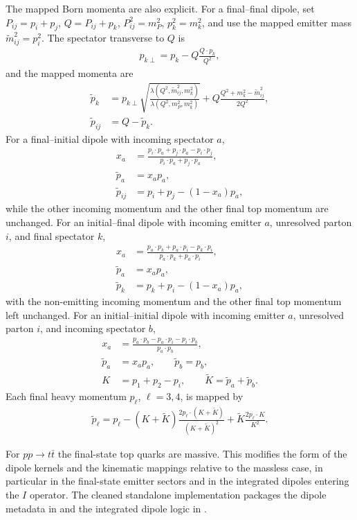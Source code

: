 \documentclass[11pt]{article}
\begin{document}
The mapped Born momenta are also explicit. For a final--final dipole, set $P_{ij}=p_i+p_j$, $Q=P_{ij}+p_k$, $P_{ij}^2=m_{P}^2$, $p_k^2=m_k^2$, and use the mapped emitter mass $\tilde m_{ij}^2=p_i^2$. The spectator transverse to $Q$ is
\begin{align}
p_{k\perp}=p_k-Q\frac{Q\!\cdot p_k}{Q^2},
\end{align}
and the mapped momenta are
\begin{align}
\tilde p_k &=
p_{k\perp}\sqrt{\frac{\lambda(Q^2,\tilde m_{ij}^2,m_k^2)}{\lambda(Q^2,m_P^2,m_k^2)}}
+Q\frac{Q^2+m_k^2-\tilde m_{ij}^2}{2Q^2},\\
\tilde p_{ij} &= Q-\tilde p_k.
\end{align}
For a final--initial dipole with incoming spectator $a$,
\begin{align}
x_a &= \frac{p_i\!\cdot p_a+p_j\!\cdot p_a-p_i\!\cdot p_j}{p_i\!\cdot p_a+p_j\!\cdot p_a},\\
\tilde p_a &= x_a p_a,\\
\tilde p_{ij} &= p_i+p_j-(1-x_a)p_a,
\end{align}
while the other incoming momentum and the other final top momentum are unchanged.
For an initial--final dipole with incoming emitter $a$, unresolved parton $i$, and final spectator $k$,
\begin{align}
x_a &= \frac{p_a\!\cdot p_k+p_a\!\cdot p_i-p_k\!\cdot p_i}{p_a\!\cdot p_k+p_a\!\cdot p_i},\\
\tilde p_a &= x_a p_a,\\
\tilde p_k &= p_k+p_i-(1-x_a)p_a,
\end{align}
with the non-emitting incoming momentum and the other final top momentum left unchanged.
For an initial--initial dipole with incoming emitter $a$, unresolved parton $i$, and incoming spectator $b$,
\begin{align}
x_a &= \frac{p_a\!\cdot p_b-p_a\!\cdot p_i-p_i\!\cdot p_b}{p_a\!\cdot p_b},\\
\tilde p_a &= x_a p_a,
\qquad
\tilde p_b=p_b,\\
K&=p_1+p_2-p_i,
\qquad
\tilde K=\tilde p_a+\tilde p_b.
\end{align}
Each final heavy momentum $p_\ell$, $\ell=3,4$, is mapped by
\begin{align}
\tilde p_\ell = p_\ell
- (K+\tilde K)\frac{2p_\ell\!\cdot(K+\tilde K)}{(K+\tilde K)^2}
+ \tilde K\frac{2p_\ell\!\cdot K}{K^2}.
\end{align}

For $pp\to t\bar t$ the final-state top quarks are massive. This modifies the form of the dipole kernels and the kinematic mappings relative to the massless case, in particular in the final-state emitter sectors and in the integrated dipoles entering the $I$ operator. The cleaned standalone implementation packages the dipole metadata in
and the integrated dipole logic in
.
\end{document}

